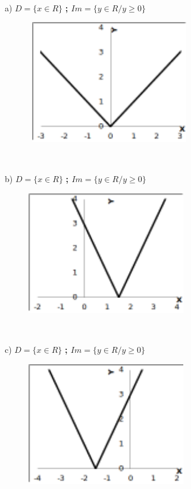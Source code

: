 \begin{respostas}{7}
~~

	\ansitem{} a)  \( D= \{ x \in R \}  \) \textbf{; \( Im= \{ y \in R/y \geq 0 \}  \) }

	\begin{figure}[H]
		\begin{Center}
			\includegraphics[width=2.82in,height=2.09in]{capitulos/outras_funcoes/media/image86.pdf}
		\end{Center}
	\end{figure}

~~

	b)  \( D= \{ x \in R \}  \) \textbf{; \( Im= \{ y \in R/y \geq 0 \}  \) }

	\begin{figure}[H]
		\begin{Center}
			\includegraphics[width=2.71in,height=2.09in]{capitulos/outras_funcoes/media/image87.pdf}
		\end{Center}
	\end{figure}

~~

	c)  \( D= \{ x \in R \}  \) \textbf{; \( Im= \{ y \in R/y \geq 0 \}  \) }

	\begin{figure}[H]
		\begin{Center}
			\includegraphics[width=2.71in,height=2.09in]{capitulos/outras_funcoes/media/image88.pdf}
		\end{Center}
	\end{figure}


\end{respostas}
